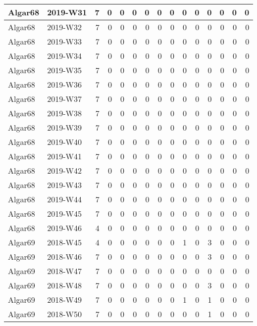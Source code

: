 \documentclass[]{book}
\begin{document}
\begin{table}
\begin{tabular}[t]{l|l|r|r|r|r|r|r|r|r|r|r|r|r|r}
\hline
Algar68 & 2019-W31 & 7 & 0 & 0 & 0 & 0 & 0 & 0 & 0 & 0 & 0 & 0 & 0 & 0\\
\hline
Algar68 & 2019-W32 & 7 & 0 & 0 & 0 & 0 & 0 & 0 & 0 & 0 & 0 & 0 & 0 & 0\\
\hline
Algar68 & 2019-W33 & 7 & 0 & 0 & 0 & 0 & 0 & 0 & 0 & 0 & 0 & 0 & 0 & 0\\
\hline
Algar68 & 2019-W34 & 7 & 0 & 0 & 0 & 0 & 0 & 0 & 0 & 0 & 0 & 0 & 0 & 0\\
\hline
Algar68 & 2019-W35 & 7 & 0 & 0 & 0 & 0 & 0 & 0 & 0 & 0 & 0 & 0 & 0 & 0\\
\hline
Algar68 & 2019-W36 & 7 & 0 & 0 & 0 & 0 & 0 & 0 & 0 & 0 & 0 & 0 & 0 & 0\\
\hline
Algar68 & 2019-W37 & 7 & 0 & 0 & 0 & 0 & 0 & 0 & 0 & 0 & 0 & 0 & 0 & 0\\
\hline
Algar68 & 2019-W38 & 7 & 0 & 0 & 0 & 0 & 0 & 0 & 0 & 0 & 0 & 0 & 0 & 0\\
\hline
Algar68 & 2019-W39 & 7 & 0 & 0 & 0 & 0 & 0 & 0 & 0 & 0 & 0 & 0 & 0 & 0\\
\hline
Algar68 & 2019-W40 & 7 & 0 & 0 & 0 & 0 & 0 & 0 & 0 & 0 & 0 & 0 & 0 & 0\\
\hline
Algar68 & 2019-W41 & 7 & 0 & 0 & 0 & 0 & 0 & 0 & 0 & 0 & 0 & 0 & 0 & 0\\
\hline
Algar68 & 2019-W42 & 7 & 0 & 0 & 0 & 0 & 0 & 0 & 0 & 0 & 0 & 0 & 0 & 0\\
\hline
Algar68 & 2019-W43 & 7 & 0 & 0 & 0 & 0 & 0 & 0 & 0 & 0 & 0 & 0 & 0 & 0\\
\hline
Algar68 & 2019-W44 & 7 & 0 & 0 & 0 & 0 & 0 & 0 & 0 & 0 & 0 & 0 & 0 & 0\\
\hline
Algar68 & 2019-W45 & 7 & 0 & 0 & 0 & 0 & 0 & 0 & 0 & 0 & 0 & 0 & 0 & 0\\
\hline
Algar68 & 2019-W46 & 4 & 0 & 0 & 0 & 0 & 0 & 0 & 0 & 0 & 0 & 0 & 0 & 0\\
\hline
Algar69 & 2018-W45 & 4 & 0 & 0 & 0 & 0 & 0 & 0 & 1 & 0 & 3 & 0 & 0 & 0\\
\hline
Algar69 & 2018-W46 & 7 & 0 & 0 & 0 & 0 & 0 & 0 & 0 & 0 & 3 & 0 & 0 & 0\\
\hline
Algar69 & 2018-W47 & 7 & 0 & 0 & 0 & 0 & 0 & 0 & 0 & 0 & 0 & 0 & 0 & 0\\
\hline
Algar69 & 2018-W48 & 7 & 0 & 0 & 0 & 0 & 0 & 0 & 0 & 0 & 3 & 0 & 0 & 0\\
\hline
Algar69 & 2018-W49 & 7 & 0 & 0 & 0 & 0 & 0 & 0 & 1 & 0 & 1 & 0 & 0 & 0\\
\hline
Algar69 & 2018-W50 & 7 & 0 & 0 & 0 & 0 & 0 & 0 & 0 & 0 & 1 & 0 & 0 & 0\\

\end{tabular}
\end{table}
\end{document}
